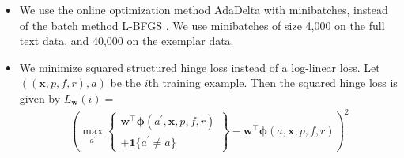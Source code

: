 \documentclass[11pt,a4paper]{article}
\makeatletter
\DeclareMathOperator*{\argmax}{arg\,max}
\newcommand{\ensuretext}[1]{#1}
\newcommand{\stmarker}{\ensuretext{\textcolor{orange}{\ensuremath{^{\textsc{S}}_{\textsc{T}}}}}}
\newcommand{\arkcomment}[3]{\ensuretext{\textcolor{#3}{[#1 #2]}}}
\newcommand{\st}[1]{\arkcomment{\stmarker}{#1}{orange}}
\renewcommand{\paragraph}{%
  \@startsection{paragraph}{4}%
  {\z@}{.2ex \@plus 1ex \@minus .2ex}{-1em}%
  {\normalfont\normalsize\bfseries}%
}
\makeatother
\begin{document}
\begin{itemize}
  \item
  We use the online optimization method AdaDelta \citep{zeiler-12} with minibatches, instead of the batch method L-BFGS \citep{liu-89}.
  We use minibatches of size 4,000  on the full text data, and 40,000 on the exemplar data.
  
  \item 
  We minimize squared structured hinge loss instead of a log-linear loss.
% 
Let $((\mathbf{x}, p, f, r), a)$ %
be the $i$th training example.
Then the squared hinge loss is given by $L_{\mathbf{w}}(i) =$
\begin{align*}
\left(\max_{a^\prime} \left\{ \begin{array}{c} \mathbf{w}^\top \boldsymbol{\phi}(a^\prime, \mathbf{x}, p, f,
r) \\ + \boldsymbol{1}\{a^\prime \not = a\} \end{array}\right \} - 
  \mathbf{w}^\top \boldsymbol{\phi}(a, \mathbf{x}, p, f, r)\right)^2
\end{align*}
\end{itemize}
\end{document}
